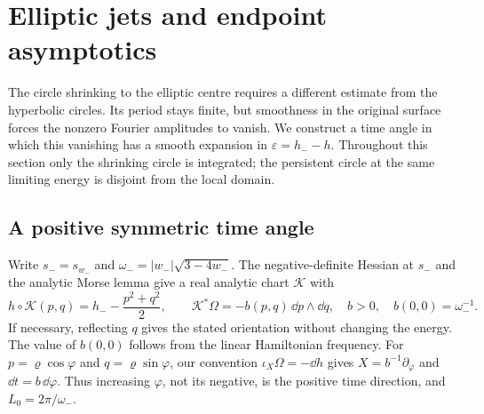\section{Elliptic jets and endpoint asymptotics}\label{sec:elliptic}

The circle shrinking to the elliptic centre requires a different estimate
from the hyperbolic circles.  Its period stays finite, but smoothness in
the original surface forces the nonzero Fourier amplitudes to vanish.
We construct a time angle in which this vanishing has a smooth expansion
in $\varepsilon=h_--h$.  Throughout this section only the shrinking circle
is integrated; the persistent circle at the same limiting energy is
disjoint from the local domain.

\subsection{A positive symmetric time angle}

Write $s_-=s_{w_-}$ and
$\omega_-=|w_-|\sqrt{3-4w_-}$.  The negative-definite Hessian at $s_-$
and the analytic Morse lemma give a real analytic chart $\mathcal K$ with
\begin{equation}\label{ell:morse-chart}
 h\circ\mathcal K(p,q)=h_--\frac{p^2+q^2}{2},\qquad
 \mathcal K^*\Omega=-b(p,q)\,\dd p\wedge\dd q,
 \quad b>0,\quad b(0,0)=\omega_-^{-1}.
\end{equation}
If necessary, reflecting $q$ gives the stated orientation without
changing the energy.  The value of $b(0,0)$ follows from the linear
Hamiltonian frequency.  For $p=\varrho\cos\varphi$ and
$q=\varrho\sin\varphi$, our convention $\iota_X\Omega=-\dd h$ gives
$X=b^{-1}\partial_\varphi$ and $\dd t=b\,\dd\varphi$.
Thus increasing $\varphi$, not its negative, is the positive time
direction, and $L_0=2\pi/\omega_-$.

